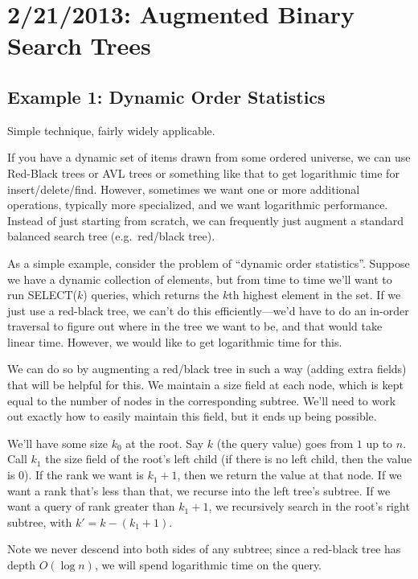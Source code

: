 \documentclass{article}
\begin{document}
\section{2/21/2013: Augmented Binary Search Trees}

\subsection{Example 1: Dynamic Order Statistics}

Simple technique, fairly widely applicable.

If you have a dynamic set of items drawn from some ordered universe, we
can use Red-Black trees or AVL trees or something like that to get
logarithmic time for insert/delete/find.
However, sometimes we want one or more additional operations, typically
more specialized, and we want logarithmic performance.
Instead of just starting from scratch, we can frequently just augment
a standard balanced search tree (e.g.\ red/black tree).

As a simple example, consider the problem of ``dynamic order statistics''.
Suppose we have a dynamic collection of elements, but from time to time
we'll want to run SELECT($k$) queries, which returns the $k$th highest
element in the set.
If we just use a red-black tree, we can't do this efficiently---we'd have
to do an in-order traversal to figure out where in the tree we want to be,
and that would take linear time.
However, we would like to get logarithmic time for this.

We can do so by augmenting a red/black tree in such
a way (adding extra fields) that will be helpful for this.
We maintain a size field at each node, which is kept equal
to the number of nodes in the corresponding subtree.
We'll need to work out exactly how to easily maintain this field, but it
ends up being possible.

We'll have some size $k_0$ at the root.
Say $k$ (the query value) goes from $1$ up to $n$.
Call $k_1$ the size field of the root's left child (if there is no left
child, then the value is 0).
If the rank we want is $k_1 + 1$, then we return the value at that node.
If we want a rank that's less than that, we recurse into the left tree's
subtree.
If we want a query of rank greater than $k_1 + 1$, we recursively search in
the root's right subtree, with $k' = k - (k_1 + 1)$.

Note we never descend into both sides of any subtree; since a red-black tree
has depth $O(\log n)$, we will spend logarithmic time on the query.
\end{document}
